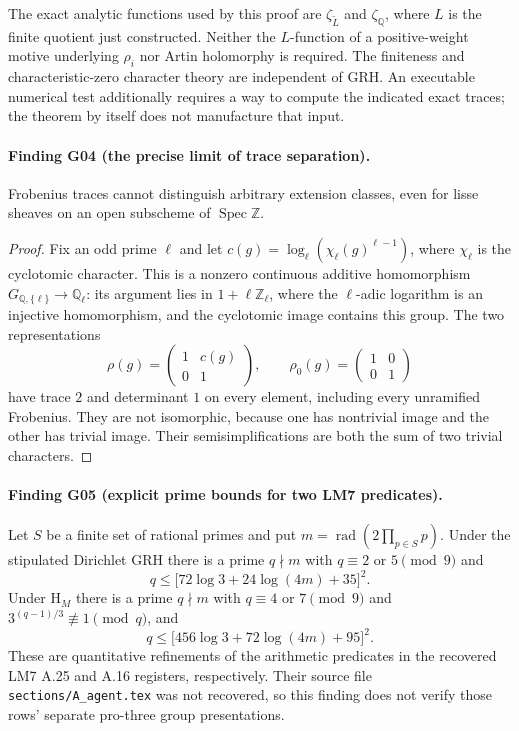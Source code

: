 The exact analytic functions used by this proof are $\zeta_{\widetilde L}$ and $\zeta_{\mathbb Q}$, where $L$ is the finite quotient just constructed.  Neither the $L$-function of a positive-weight motive underlying $\rho_i$ nor Artin holomorphy is required. The finiteness and characteristic-zero character theory are independent of GRH. An executable numerical test additionally requires a way to compute the indicated exact traces; the theorem by itself does not manufacture that input.

\paragraph{Finding G04 (the precise limit of trace separation).}
Frobenius traces cannot distinguish arbitrary extension classes, even for lisse sheaves on an open subscheme of $\operatorname{Spec}\mathbb Z$.

\begin{proof}
Fix an odd prime $\ell$ and let $c(g)=\log_\ell(\chi_\ell(g)^{\ell-1})$, where $\chi_\ell$ is the cyclotomic character. This is a nonzero continuous additive homomorphism $G_{\mathbb Q,\{\ell\}}\to\mathbb Q_\ell$: its argument lies in $1+\ell\mathbb Z_\ell$, where the $\ell$-adic logarithm is an injective homomorphism, and the cyclotomic image contains this group. The two representations
\[
 \rho(g)=\begin{pmatrix}1&c(g)\\0&1\end{pmatrix},
 \qquad \rho_0(g)=\begin{pmatrix}1&0\\0&1\end{pmatrix}
\]
have trace $2$ and determinant $1$ on every element, including every unramified Frobenius. They are not isomorphic, because one has nontrivial image and the other has trivial image. Their semisimplifications are both the sum of two trivial characters.
\end{proof}

\paragraph{Finding G05 (explicit prime bounds for two LM7 predicates).}
Let $S$ be a finite set of rational primes and put
$m=\operatorname{rad}(2\prod_{p\in S}p)$.  Under the stipulated
Dirichlet GRH there is a prime $q\nmid m$ with $q\equiv2$ or $5\pmod9$
and
\[
 q\le\bigl[72\log3+24\log(4m)+35\bigr]^2. \tag{G05.1}
\]
Under $\mathrm H_M$ there is a prime $q\nmid m$ with $q\equiv4$ or
$7\pmod9$ and $3^{(q-1)/3}\not\equiv1\pmod q$, and
\[
 q\le\bigl[456\log3+72\log(4m)+95\bigr]^2. \tag{G05.2}
\]
These are quantitative refinements of the arithmetic predicates in the
recovered LM7 A.25 and A.16 registers, respectively.  Their source file
\texttt{sections/A\_agent.tex} was not recovered, so this finding does
not verify those rows' separate pro-three group presentations.


